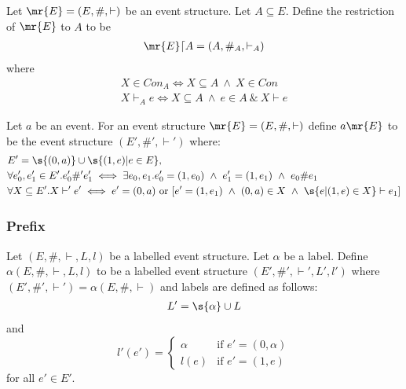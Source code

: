 \begin{definition}[Restriction]
    Let $\mr{E} = (E,\#,\vdash)$ be an event structure.
    Let $A \subseteq E$.
    Define the restriction of $\mr{E}$ to $A$ to be
    \begin{align*}
        \mr{E} \lceil A = (A,\#_A,\vdash_A)
    \end{align*}
    where
    \begin{align*}
        X \in Con_A \iff X \subseteq A \ \wedge \ X \in Con \\
        X \vdash_A e \iff X \subseteq A \ \wedge \ e \in A \ \& \ X \vdash e
    \end{align*}
\end{definition}

\begin{definition}[Prefixing]
    Let $a$ be an event.
    For an event structure $\mr{E} = (E,\#,\vdash)$ define $a\mr{E}$ to be the event structure $(E',\#',\vdash')$ where:
    \begin{align*}
         & E' = \s{(0,a)} \cup \s{(1,e)|e \in E},                                                                                                        \\
         & \forall e_0',e_1'\in E' . e_0' \#' e_1'  \iff \exists e_0,e_1.e_0' = (1,e_0)
        \ \wedge \ e_1' = (1,e_1) \ \wedge \ e_0 \# e_1                                                                                                  \\
         & \forall X \subseteq E' . X \vdash' e' \iff e' = (0,a) \text{ or } [e' = (1,e_1) \ \wedge \ (0,a)\in X \ \wedge \ \s{e|(1,e)\in X} \vdash e_1]
    \end{align*}
\end{definition}

\subsubsection{Prefix}
\begin{definition}[Prefix]
    Let $(E,\#,\vdash,L,l)$ be a labelled event structure.
    Let $\alpha$ be a label.
    Define $\alpha(E,\#,\vdash,L,l)$ to be a labelled event structure
    $(E',\#',\vdash',L',l')$ where $(E',\#',\vdash') = \alpha(E,\#,\vdash)$
    and labels are defined as follows:
    \begin{align*}
        L' = \s{\alpha} \cup L
    \end{align*}
    and
    $$
        l'(e') = \begin{cases}
            \alpha & \text{if } e' = (0,\alpha) \\
            l(e)   & \text{if } e' = (1,e)
        \end{cases}
    $$
    for all $e' \in E'$.
\end{definition}

